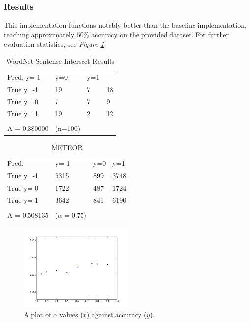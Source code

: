 \documentclass{article}
\begin{document}
\subsubsection{Results}
This implementation functions notably better than the baseline implementation, reaching approximately $50\%$ accuracy on the provided dataset. For further evaluation statistics, see \textit{Figure \ref{fig:meteoralpha}}.





\begin{table}[tbp]
\centering
\caption{WordNet Sentence Intersect Results}
\label{t1}
\begin{tabular}{llll}
Pred. y=-1          & y=0 & y=1 &    \\
True y=-1           & 19  & 7   & 18 \\
True y= 0           & 7   & 7   & 9  \\
True y= 1           & 19  & 2   & 12 \\
                    &     &     &    \\
A = 0.380000 &  (n=100)     &     &
\end{tabular}
\end{table}

\begin{table}[tbp]
\centering
\caption{METEOR}
\label{t2}
\begin{tabular}{llll}
Pred.               & y=-1 & y=0 & y=1  \\
True y=-1           & 6315 & 899 & 3748 \\
True y= 0           & 1722 & 487 & 1724 \\
True y= 1           & 3642 & 841 & 6190 \\
                    &      &     &      \\
A = 0.508135 & ($\alpha=0.75$)     &     &
\end{tabular}
\end{table}

\begin{figure}[h]
\caption{A plot of $\alpha$ values ($x$) against accuracy ($y$).}
\label{fig:meteoralpha}
\centering
\includegraphics[width=0.5\textwidth]{figure_1}
\end{figure}
\end{document}
